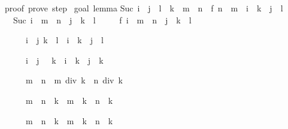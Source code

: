\begin{isabellebody}
\begin{isamarkuptext}
proof\ {\isacharparenleft}prove{\isacharparenright}{\isacharcolon}\ step\ {}\isanewline
\isanewline
goal\ {\isacharparenleft}lemma{\isacharparenright}{\isacharcolon}\isanewline
Suc\ {\isacharparenleft}i\ {\isacharplus}\ j\ {\isacharasterisk}\ l\ {\isacharasterisk}\ k\ {\isacharplus}\ m\ {\isacharasterisk}\ n{\isacharparenright}\ {\isacharequal}\ f\ {\isacharparenleft}n\ {\isacharasterisk}\ m\ {\isacharplus}\ i\ {\isacharplus}\ k\ {\isacharasterisk}\ j\ {\isacharasterisk}\ l{\isacharparenright}\isanewline
\ {}{\isachardot}\ Suc\ {\isacharparenleft}i\ {\isacharplus}\ {\isacharparenleft}m\ {\isacharasterisk}\ n\ {\isacharplus}\ j\ {\isacharasterisk}\ {\isacharparenleft}k\ {\isacharasterisk}\ l{\isacharparenright}{\isacharparenright}{\isacharparenright}\ {\isacharequal}\isanewline
\ \ \ \ f\ {\isacharparenleft}i\ {\isacharplus}\ {\isacharparenleft}m\ {\isacharasterisk}\ n\ {\isacharplus}\ j\ {\isacharasterisk}\ {\isacharparenleft}k\ {\isacharasterisk}\ l{\isacharparenright}{\isacharparenright}{\isacharparenright}%
\end{isamarkuptext}%
%
\begin{isamarkuptext}%
\begin{isabelle}%
\ \ \ \ \ {\isasymlbrakk}i\ {\isasymle}\ j{\isacharsemicolon}\ k\ {\isasymle}\ l{\isasymrbrakk}\ {\isasymLongrightarrow}\ i\ {\isacharasterisk}\ k\ {\isasymle}\ j\ {\isacharasterisk}\ l%
\end{isabelle}

\begin{isabelle}%
\ \ \ \ \ {\isasymlbrakk}i\ {\isacharless}\ j{\isacharsemicolon}\ {}\ {\isacharless}\ k{\isasymrbrakk}\ {\isasymLongrightarrow}\ i\ {\isacharasterisk}\ k\ {\isacharless}\ j\ {\isacharasterisk}\ k%
\end{isabelle}

\begin{isabelle}%
\ \ \ \ \ m\ {\isasymle}\ n\ {\isasymLongrightarrow}\ m\ div\ k\ {\isasymle}\ n\ div\ k%
\end{isabelle}

\begin{isabelle}%
\ \ \ \ \ {\isacharparenleft}m\ {\isacharplus}\ n{\isacharparenright}\ {\isacharasterisk}\ k\ {\isacharequal}\ m\ {\isacharasterisk}\ k\ {\isacharplus}\ n\ {\isacharasterisk}\ k%
\end{isabelle}

\begin{isabelle}%
\ \ \ \ \ {\isacharparenleft}m\ {\isacharminus}\ n{\isacharparenright}\ {\isacharasterisk}\ k\ {\isacharequal}\ m\ {\isacharasterisk}\ k\ {\isacharminus}\ n\ {\isacharasterisk}\ k%
\end{isabelle}


\end{isamarkuptext}
\end{isabellebody}
